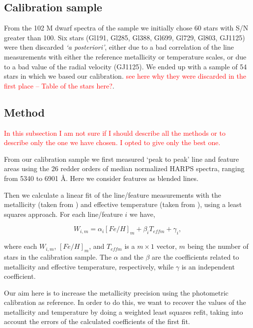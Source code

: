 \documentclass[structabstract]{aa}
\begin{document}
\subsection{Calibration sample}

From the 102 M dwarf spectra of the \citet{Bonfils-2011} sample we initially chose 60 stars with S/N greater than 100. Six stars (Gl191, Gl285, Gl388, Gl699, Gl729, Gl803, GJ1125) were then discarded \textit{`a posteriori'}, either due to a bad correlation of the line measurements with either the reference metallicity or temperature scales, or due to a bad value of the radial velocity (GJ1125). We ended up with a sample of 54 stars in which we based our calibration. \textcolor{red}{see here why they were discarded in the first place -- Table of the stars here?}. 

\subsection{Method}
\textcolor{red}{In this subsection I am not sure if I should describe all the methods or to describe only the one we have chosen. I opted to give only the best one.}

From our calibration sample we first measured `peak to peak' line and feature areas using the 26 redder orders of median normalized HARPS spectra, ranging from 5340 to 6901 \AA. Here we consider features as blended lines. 

Then we calculate a linear fit of the line/feature measurements with the metallicity (taken from \citet{Neves-2012}) and effective temperature (taken from \citet{Casagrande-2008}), using a least squares approach. For each line/feature $i$ we have,

\begin{equation}
W_{i,m} = \alpha_{i}[Fe/H]_{m} + \beta_{i}T_{eff m} + \gamma_{i},
\end{equation}

where each $W_{i,m}$, $[Fe/H]_{m}$, and $T_{eff m}$ is a $m\times1$ vector,  $m$ being the number of stars in the calibration sample. The $\alpha$ and the $\beta$ are the coefficients related to metallicity and effective temperature, respectively, while $\gamma$ is an independent coefficient. 


Our aim here is to increase the metallicity precision using the photometric calibration as reference. In order to do this, we want to recover the values of the metallicity and temperature by doing a weighted least squares refit, taking into account the errors of the calculated coefficients of the first fit. 
\end{document}
